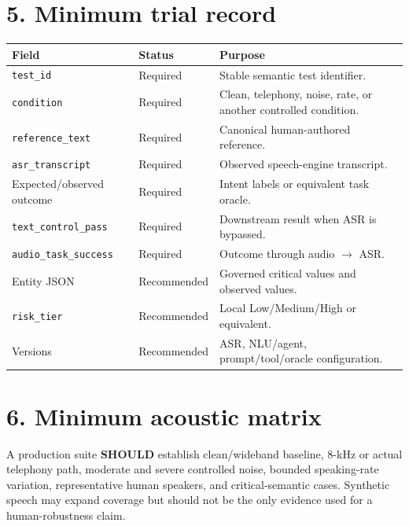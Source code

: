 \documentclass[10pt]{article}
\begin{document}
\section*{5. Minimum trial record}
\begin{center}\small
\begin{tabular}{lp{1.0in}p{4.4in}}
\toprule
Field & Status & Purpose\\
\midrule
\texttt{test\_id} & Required & Stable semantic test identifier.\\
\texttt{condition} & Required & Clean, telephony, noise, rate, or another controlled condition.\\
\texttt{reference\_text} & Required & Canonical human-authored reference.\\
\texttt{asr\_transcript} & Required & Observed speech-engine transcript.\\
Expected/observed outcome & Required & Intent labels or equivalent task oracle.\\
\texttt{text\_control\_pass} & Required & Downstream result when ASR is bypassed.\\
\texttt{audio\_task\_success} & Required & Outcome through audio $\rightarrow$ ASR.\\
Entity JSON & Recommended & Governed critical values and observed values.\\
\texttt{risk\_tier} & Recommended & Local Low/Medium/High or equivalent.\\
Versions & Recommended & ASR, NLU/agent, prompt/tool/oracle configuration.\\
\bottomrule
\end{tabular}
\end{center}

\section*{6. Minimum acoustic matrix}
A production suite \textbf{SHOULD} establish clean/wideband baseline, 8-kHz or actual telephony path, moderate and severe controlled noise, bounded speaking-rate variation, representative human speakers, and critical-semantic cases. Synthetic speech may expand coverage but should not be the only evidence used for a human-robustness claim.
\end{document}
